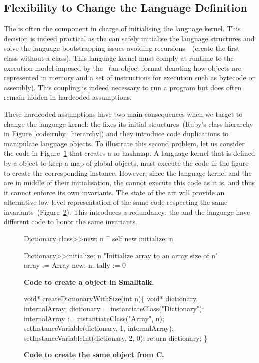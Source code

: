 \subsection{Flexibility to Change the Language Definition}

The \VM is often the component in charge of initialising the language kernel. This decision is indeed practical as the \VM can safely initialise the language structures and solve the language bootstrapping issues avoiding recursions~\cite{Kicz91a}~(\eg create the first class without a class). This language kernel must comply at runtime to the execution model imposed by the \VM~(\eg an object format denoting how objects are represented in memory and a set of instructions for execution such as bytecode or assembly). This coupling is indeed necessary to run a program but does often remain hidden in hardcoded assumptions.

These hardcoded \VM assumptions have two main consequences when we target to change the language kernel: the \VM fixes its initial structures~(\eg Ruby's class hierarchy in Figure \ref{code:ruby_hierarchy}) and they introduce code duplications to manipulate language objects.
To illustrate this second problem, let us consider the code in Figure~\ref{code:logic_dup} that creates a  or hashmap. A language kernel that is defined by a  object to keep \eg a map of global objects, must execute the code in the figure to create the corresponding instance. However, since the language kernel and the \VM are in middle of their initialisation, the \VM cannot execute this code as it is, and thus it cannot enforce its own invariants. The state of the art \VMs will provide an alternative low-level representation of the same code respecting the same invariants~(Figure~\ref{code:logic_dup2}). This introduces a redundancy: the \VM and the language have different code to honor the same invariants.

\begin{figure}[ht]
\begin{code}
Dictionary class>>new: n
    ^ self new initialize: n

Dictionary>>initialize: n
    "Initialize array to an array size of n"
    array := Array new: n.
    tally := 0
\end{code}
\caption{\textbf{Code to create a  object in Smalltalk.}\label{code:logic_dup}}
\end{figure}

\begin{figure}[ht]
\begin{code}
void* createDictionaryWithSize(int n)\{
    void* dictionary, internalArray;
    dictionary = instantiateClass("Dictionary");
    internalArray := instantiateClass("Array", n);
    setInstanceVariable(dictionary, 1, internalArray);
    setInstanceVariableInt(dictionary, 2, 0);
    return dictionary;
\}
\end{code}
\caption{\textbf{Code to create the same  object from C.}\label{code:logic_dup2}}
\end{figure}


